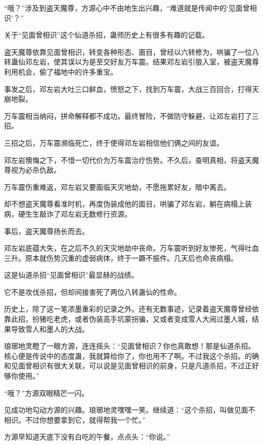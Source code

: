 
\begin{this_body}



“哦？”涉及到盗天魔尊，方源心中不由地生出兴趣，“难道就是传闻中的‘见面曾相识’？”

关于“见面曾相识”这个仙道杀招，蛊师历史上有很多有趣的记载。

盗天魔尊依靠见面曾相识，转变各种形态、面目，曾经以六转修为，哄骗了一位八转蛊仙邓左岩，使其误以为是至交好友万车震。结果邓左岩引狼入室，被盗天魔尊利用机会，偷了福地中的许多重宝。

事发之后，邓左岩大吐三口鲜血，愤怒之下，找到万车震，大战三百回合，打得天崩地裂。

万车震相当纳闷，拼命解释都不成功。最终冒险，不做防守躲避，让邓左岩打了三招。

三招之后，万车震濒临死亡，终于使得邓左岩相信他们俩之间的友谊。

邓左岩懊悔之下，不惜一切代价为万车震治疗伤势。不久后，查明真相，将盗天魔尊视为必杀仇敌。

万车震伤重难返，邓左岩又要面临天灾地劫，不愿拖累好友，暗中离去。

却不想盗天魔尊看准时机，再度伪装成他的面目，哄骗了邓左岩，躺在病榻上装病，硬生生敲诈了邓左岩无数修行资源。

事后，盗天魔尊扬长而去。

邓左岩底蕴大失，在之后不久的天灾地劫中丧命。万车震听到好友惨死，气得吐血三升。原本就伤势沉重的虚弱病体，终于一蹶不振件。几天后也命丧病榻。

这是仙道杀招“见面曾相识”最显赫的战绩。

它不是攻伐杀招，但却间接害死了两位八转蛊仙的性命。

历史上，除了这一笔浓墨重彩的记录之外。还有无数事迹，记录着盗天魔尊曾经依靠此招，扮猪吃老虎，或者伪装高手坑蒙拐骗，又或者变成雪人大闹过墨人城，结果导致雪人和墨人的大战。

琅琊地灵瞪了一眼方源，连连摇头：“见面曾相识？你也真敢想！那是仙道杀招。核心便是传说中的态度蛊，我就算给你了，你也用不了啊。不过我这个杀招。的确和见面曾相识有很大关联，可以说是见面曾相识的前身，只是凡道杀招，不过正好够你使用。”

“哦？”方源双眼精芒一闪。

见成功地勾动方源的兴趣。琅琊地灵嘿嘿一笑。继续道：“这个杀招，叫做见面不相识。不过你想要拿到它，就得帮我一个忙。”

方源早知道天底下没有白吃的午餐，点点头：“你说。”


\end{this_body}
